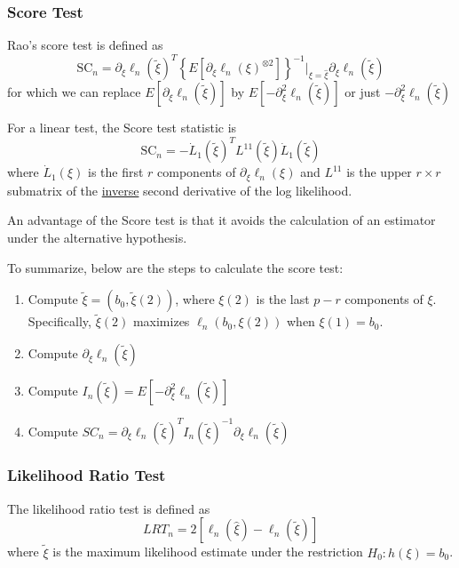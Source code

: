 \documentclass[12pt]{article}
\numberwithin{equation}{section}
\begin{document}
\subsubsection{Score Test}
Rao's score test is defined as
\begin{equation*}
  \text{SC}_n = \partial_{\xi} \ell_n(\tilde{\xi})^T
    \left\{ 
      E[\partial_{\xi} \ell_n(\xi)^{\otimes 2}]
    \right\}^{-1} \rvert_{\xi = \hat{\xi}}
    \partial_{\xi} \ell_n(\tilde{\xi})
\end{equation*}
for which we can replace $E[\partial_\xi \ell_n (\tilde{\xi})]$  by 
$E[-\partial_{\xi}^2 \ell_n (\tilde{\xi})]$ or just $-\partial_{\xi}^2 \ell_n (\tilde{\xi})$

For a linear test, the Score test statistic is
\begin{equation*}
  \text{SC}_n = -\dot{L}_1(\tilde{\xi})^T L^{11}(\tilde{\xi}) \dot{L}_1(\tilde{\xi})
\end{equation*}
where $\dot{L}_1(\xi)$ is the first $r$ components of
$\partial_{\xi} \ell_n(\xi)$ and $L^{11}$ is the upper $r \times r$ submatrix of the \underline{inverse} second derivative of the log likelihood.

An advantage of the Score test is that it avoids the calculation of an estimator under the alternative hypothesis.

To summarize, below are the steps to calculate the score test:
\begin{enumerate}
  \item Compute $\tilde{\xi} = (b_0, \tilde{\xi}(2))$, where $\xi(2)$ is the last $p - r$ components of $\xi$. Specifically,
  $\tilde{\xi}(2)$ maximizes $\ell_n(b_0, \xi(2))$ when $\xi(1) = b_0$. 
  \item Compute $\partial_{\xi} \ell_n(\tilde{\xi})$
  \item Compute $I_n(\tilde{\xi}) = E[-\partial_{\xi}^2 \ell_n(\tilde{\xi})]$
  \item Compute $SC_n = \partial_{\xi} \ell_n(\tilde{\xi})^T
    I_n(\tilde{\xi})^{-1} \partial_{\xi} \ell_n(\tilde{\xi})$
\end{enumerate}



\subsubsection{Likelihood Ratio Test}
The likelihood ratio test is defined as
\begin{equation*}
  LRT_n = 2[\ell_n(\hat{\xi}) - \ell_n(\tilde{\xi})]
\end{equation*}
where $\tilde{\xi}$ is the maximum likelihood estimate under the restriction $H_0: h(\xi) = b_0$. 
\end{document}
